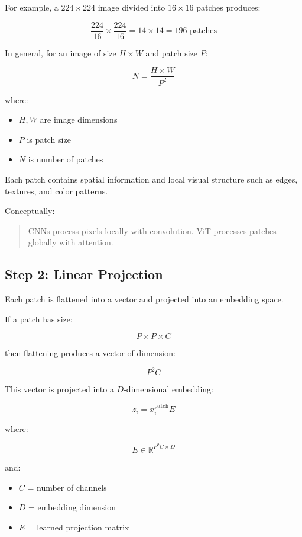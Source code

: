 \documentclass[11pt]{article}
\begin{document}
For example, a $224 \times 224$ image divided into $16 \times 16$ patches produces:

\[
\frac{224}{16} \times \frac{224}{16}
=
14 \times 14
=
196 \text{ patches}
\]

In general, for an image of size $H \times W$ and patch size $P$:

\[
N = \frac{H \times W}{P^2}
\]

where:

\begin{itemize}[nosep]

\item $H,W$ are image dimensions
\item $P$ is patch size
\item $N$ is number of patches

\end{itemize}

Each patch contains spatial information and local visual structure such as edges, textures, and color patterns.

Conceptually:

\begin{quote}
CNNs process pixels locally with convolution.  
ViT processes patches globally with attention.
\end{quote}

\subsection{Step 2: Linear Projection}

Each patch is flattened into a vector and projected into an embedding space.

If a patch has size:

\[
P \times P \times C
\]

then flattening produces a vector of dimension:

\[
P^2 C
\]

This vector is projected into a $D$-dimensional embedding:

\[
z_i = x_i^{\text{patch}} E
\]

where:

\[
E \in \mathbb{R}^{P^2 C \times D}
\]

and:

\begin{itemize}[nosep]

\item $C$ = number of channels
\item $D$ = embedding dimension
\item $E$ = learned projection matrix

\end{itemize}
\end{document}
